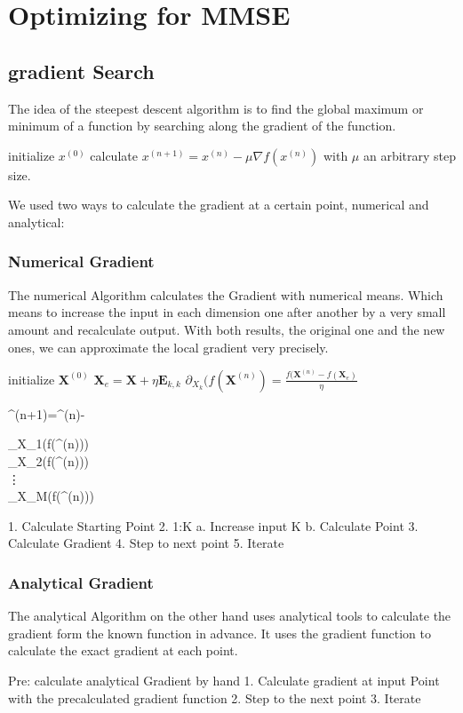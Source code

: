 \section{Optimizing for MMSE}
\subsection{gradient Search}

The idea of the steepest descent algorithm is to find the global maximum or minimum of a function by searching along the gradient of the function.
\begin{algorithmic}
	\STATE initialize $x^{(0)}$
	\REPEAT
	\STATE calculate $x^{(n+1)}=x^{(n)}-\mu\nabla f(x^{(n)})$ with $\mu$ an arbitrary step size.
\end{algorithmic}
We used two ways to calculate the gradient at a certain point, numerical and analytical:

\subsubsection{Numerical Gradient}
The numerical Algorithm calculates the Gradient with numerical means. Which means to increase the input in each dimension one after another by a very small amount and recalculate output. With both results, the original one and the new ones, we can approximate the local gradient very precisely.
\begin{algorithmic}
	\STATE initialize $\mathbf{X}^{(0)}$
	\REPEAT
		\STATE $\mathbf{X}_e = \mathbf{X} + \eta\mathbf{E}_{k,k}$
		\STATE $\partial_{X_k}(f(\mathbf{X}^{(n)}) = \frac{f(\mathbf{X}^{(n)}-f(\mathbf{X}_e)}{\eta}$
		\ENDFOR
		\STATE 
		\begin{flalign*}
			^{(n+1)}=^{(n)}-\mu
			\begin{bmatrix}
				\partial_{X_1}(f(^{(n)}))\\
				\partial_{X_2}(f(^{(n)})) \\
				\vdots\\
				\partial_{X_M}(f(^{(n)}))
			\end{bmatrix}
		\end{flalign*}
1.	Calculate Starting Point
2.	1:K 
a.	Increase input K
b.	Calculate Point
3.	Calculate Gradient
4.	Step to next point
5.	Iterate
\end{algorithmic}
\subsubsection{Analytical Gradient}
The analytical Algorithm on the other hand uses analytical tools to calculate the gradient form the known function in advance. It uses the gradient function to calculate the exact gradient at each point.
\begin{algorithm}
	Pre: calculate analytical Gradient by hand
	1.	Calculate gradient at input Point with the precalculated gradient function
	2.	Step to the next point
	3.	Iterate
\end{algorithm}

